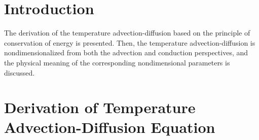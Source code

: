 \providecommand{\partialTimeTemp}{\partial_t\theta}
\providecommand{\inertTermTemp}{(\velocity \cdot \nabla)\theta}
\providecommand{\tempGrad}{\nabla \theta}
\providecommand{\laplacianTemp}{\Delta\theta}


\providecommand{\divergenceNondim}{\nabla^{\prime}\cdot}

\providecommand{\velocityNondim}{\mathbf{v^{\prime}}}

\providecommand{\substDerivVelNondim}{\frac{D\velocity^{\prime}}{dt^{\prime}}}
\providecommand{\partialTimeVelNondim}{\partial_{t^{\prime}}\velocity^{\prime}}
\providecommand{\inertTermVelNondim}{(\velocity^{\prime} \cdot \nabla^{\prime})\velocity^{\prime}}

\providecommand{\velocityPressureTensorNondim}{\partial_k^{\prime}v^{l \prime}\partial_k^{\prime}v^{l \prime}}

\providecommand{\pressGradNondim}{\nabla^{\prime} p^{\prime}}
\providecommand{\pressLaplacianNondim}{\Delta^{\prime} p^{\prime}}
\providecommand{\laplacianVelNondim}{\Delta^{\prime}\velocity^{\prime}}


\section{Introduction}

The derivation of the temperature advection-diffusion based on the principle of conservation of energy is presented. Then, the temperature advection-diffusion is nondimensionalized from both the advection and conduction perspectives, and the physical meaning of the corresponding nondimensional parameters is discussed. 

\section{Derivation of Temperature Advection-Diffusion Equation}


